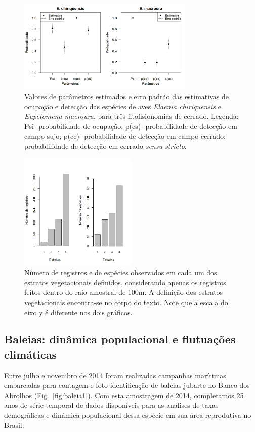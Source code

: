 \documentclass[12pt, A4]{article}
\begin{document}
\begin{figure}
  \centering
\includegraphics[width=0.75\textwidth]{figures/deteccao/deteccao.jpg}
  \caption{Valores de parâmetros estimados e erro padrão das estimativas de ocupação e detecção das espécies de aves \textit{Elaenia chiriquensis} e \textit{Eupetomena macroura}, para três fitofisionomias de cerrado. Legenda: Psi- probabilidade de ocupação; p(cs)- probabilidade de detecção em campo sujo; p(cc)- probabilidade de detecção em campo cerrado; probablilidade de detecção em cerrado \textit{sensu stricto}.}
  \label{fig:aves6} 
\end{figure}

\begin{figure}
  \centering
\includegraphics[width=0.5\textwidth]{figures/dados_strata/dados_strata.jpg}
  \caption{Número de registros e de espécies observados em cada um dos estratos vegetacionais definidos, considerando apenas os registros feitos dentro do raio amostral de 100m. 
A definição dos estratos vegetacionais encontra-se no corpo do texto. Note que a escala do eixo y é diferente nos dois gráficos.}
\label{fig:aves4} 
\end{figure}

\subsection{Baleias: dinâmica populacional e flutuações climáticas} %
\label{sec:dinam-popul-de}
Entre julho e novembro de 2014 foram realizadas campanhas marítimas
embarcadas para contagem e foto-identificação de baleias-jubarte no
Banco dos Abrolhos (Fig.~\ref{fig:baleia1}). 
Com esta amostragem de 2014, completamos 25
anos de série temporal de dados disponíveis para as análises de taxas
demográficas e dinâmica populacional dessa espécie em sua área
reprodutiva no Brasil.
\end{document}

